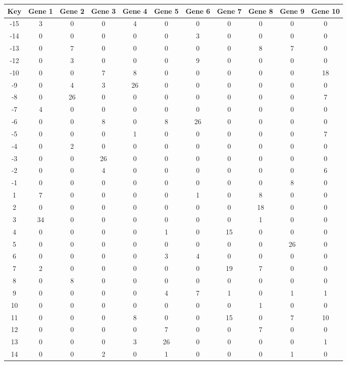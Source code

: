 \begin{tabular}{|c|c|c|c|c|c|c|c|c|c|c|}
\hline
Key & Gene 1 & Gene 2 & Gene 3 & Gene 4 & Gene 5 & Gene 6 & Gene 7 & Gene 8 & Gene 9 & Gene 10 \\
\hline
-15 & 3 & 0 & 0 & 4 & 0 & 0 & 0 & 0 & 0 & 0 \\
-14 & 0 & 0 & 0 & 0 & 0 & 3 & 0 & 0 & 0 & 0 \\
-13 & 0 & 7 & 0 & 0 & 0 & 0 & 0 & 8 & 7 & 0 \\
-12 & 0 & 3 & 0 & 0 & 0 & 9 & 0 & 0 & 0 & 0 \\
-10 & 0 & 0 & 7 & 8 & 0 & 0 & 0 & 0 & 0 & 18 \\
-9 & 0 & 4 & 3 & 26 & 0 & 0 & 0 & 0 & 0 & 0 \\
-8 & 0 & 26 & 0 & 0 & 0 & 0 & 0 & 0 & 0 & 7 \\
-7 & 4 & 0 & 0 & 0 & 0 & 0 & 0 & 0 & 0 & 0 \\
-6 & 0 & 0 & 8 & 0 & 8 & 26 & 0 & 0 & 0 & 0 \\
-5 & 0 & 0 & 0 & 1 & 0 & 0 & 0 & 0 & 0 & 7 \\
-4 & 0 & 2 & 0 & 0 & 0 & 0 & 0 & 0 & 0 & 0 \\
-3 & 0 & 0 & 26 & 0 & 0 & 0 & 0 & 0 & 0 & 0 \\
-2 & 0 & 0 & 4 & 0 & 0 & 0 & 0 & 0 & 0 & 6 \\
-1 & 0 & 0 & 0 & 0 & 0 & 0 & 0 & 0 & 8 & 0 \\
1 & 7 & 0 & 0 & 0 & 0 & 1 & 0 & 8 & 0 & 0 \\
2 & 0 & 0 & 0 & 0 & 0 & 0 & 0 & 18 & 0 & 0 \\
3 & 34 & 0 & 0 & 0 & 0 & 0 & 0 & 1 & 0 & 0 \\
4 & 0 & 0 & 0 & 0 & 1 & 0 & 15 & 0 & 0 & 0 \\
5 & 0 & 0 & 0 & 0 & 0 & 0 & 0 & 0 & 26 & 0 \\
6 & 0 & 0 & 0 & 0 & 3 & 4 & 0 & 0 & 0 & 0 \\
7 & 2 & 0 & 0 & 0 & 0 & 0 & 19 & 7 & 0 & 0 \\
8 & 0 & 8 & 0 & 0 & 0 & 0 & 0 & 0 & 0 & 0 \\
9 & 0 & 0 & 0 & 0 & 4 & 7 & 1 & 0 & 1 & 1 \\
10 & 0 & 0 & 0 & 0 & 0 & 0 & 0 & 1 & 0 & 0 \\
11 & 0 & 0 & 0 & 8 & 0 & 0 & 15 & 0 & 7 & 10 \\
12 & 0 & 0 & 0 & 0 & 7 & 0 & 0 & 7 & 0 & 0 \\
13 & 0 & 0 & 0 & 3 & 26 & 0 & 0 & 0 & 0 & 1 \\
14 & 0 & 0 & 2 & 0 & 1 & 0 & 0 & 0 & 1 & 0 \\
\hline
\end{tabular}
